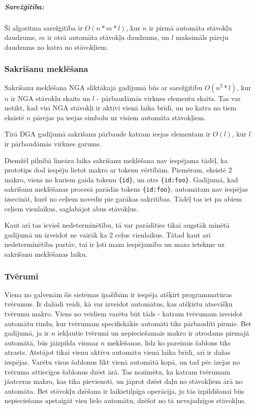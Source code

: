 \subparagraph{Sarežģītība:}
Šī algoritma sarežģītība ir $O(n*m*l)$, kur  $n$ ir pirmā automāta stāvokļu daudzums, $m$ ir otrā automāta stāvokļu daudzums, un $l$ maksimāls pāreju daudzums no katra no stāvokļiem.

\subsubsection{Sakrišanu meklēšana}
Sakrišanu meklēšana NGA sliktākajā gadījumā būs ar sarežģītību $O(n^2*l)$, kur $n$ ir NGA stāvokļu skaits un $l$ - pārbaudāmās virknes elementu skaits. Tas var notikt, kad visi NGA stāvokļi ir aktīvi vienā laika brīdī, un no katra no tiem eksistē $n$ pārejas pa ieejas simbolu uz visiem automāta stāvokļiem.

Tīrā DGA gadījumā sakrišanu pārbaude katram ieejas elementam ir $O(l)$, kur $l$ ir pārbaudāmās virknes garums. 

Diemžēl pilnībā lineāra laika sakrišanu meklēšana nav iespējama tādēļ, ka prototips dod iespēju lietot makro ar tokenu vērtībām. Piemēram, eksistē 2 makro, viens no kuriem gaida tokenu \verb|{id}|, un otrs \verb|{id:foo}|. Gadījumā, kad sakrišanu meklēšanas procesā parādās tokens \verb|{id:foo}|, automātam nav iespējas izsecināt, kurš no ceļiem novedīs pie garākas sakritības. Tādēļ tas iet pa abiem ceļiem vienlaikus, saglabājot abus stāvokļus.

Kaut arī tas ievieš nedeterminētību, tā var parādīties tikai augstāk minētā gadījumā un izveidot ne vairāk ka 2 ceļus vienlaikus. Tātad kaut arī nedeterminētība pastāv, tai ir ļoti maza iespējamība un maza ietekme uz sakrišanu meklēšanas laiku.

\subsubsection{Tvērumi}

Viena no galvenām šīs sistēmas īpašībām ir iespēja atšķirt programmatūras tvērumus. Ir dažādi veidi, kā var izveidot automātus, kas atšķirtu atsevišķu tvērumu makro. Viens no veidiem varētu būt tāds - katram tvērumam izveidot automātu rindu, kur tvērumam specifiskākie automāti tiks pārbaudīti pirmie. Bet gadījumā, ja ir $n$ iekļautie tvērumi un nepieciešamais makro ir atrodams pirmajā automātā, būs jāizpilda vismaz $n$ meklēšanas, līdz ko pareizais šablons tiks atrasts. Atstājot tikai vienu aktīvu automātu vienā laika brīdī, arī ir dažas iespējas. Varētu visus šablonus likt vienā automātā kopā, un tad pēc izejas no tvēruma attiecīgos šablonus dzēst ārā. Tas nozīmētu, ka katram tvērumam jāatceras makro, kas tika pievienoti, un jāprot dzēst daļu no stāvokļiem ārā no automāta. Bet stāvokļu dzēšana ir laikietilpīga operācija, jo tās izpildīšanai būs nepieciešams apstaigāt visu lielo automātu, dzēšot no tā nevajadzīgos stāvokļus.

